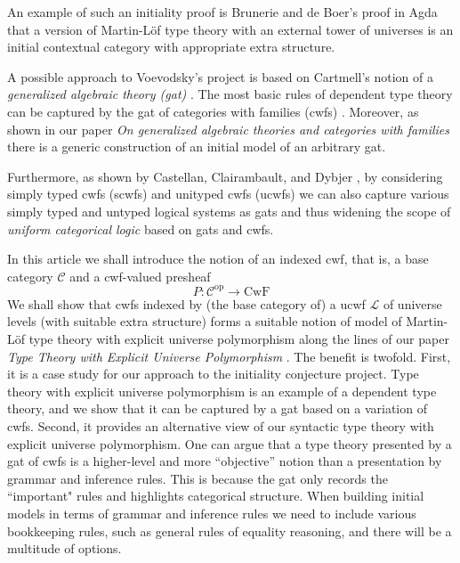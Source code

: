 \documentclass[11pt,a4paper]{article}
\theoremstyle{definition}
\newcommand{\op}{\mathrm{op}}
\def\L{{\mathcal{L}}}
\def\CwF{\mathrm{CwF}}
\def\C{\mathcal{C}}
\begin{document}
An example of such an initiality proof is Brunerie and de Boer's \cite{Brunerie:initiality,deBoer:lic} proof in Agda that a version of Martin-Löf type theory with an external tower of universes is an initial contextual category \cite{cartmell:phd,cartmell:apal} with appropriate extra structure. %

A possible approach to Voevodsky's project is based on Cartmell's notion of a {\em generalized algebraic theory (gat)} \cite{cartmell:phd,cartmell:apal}. The most basic rules of dependent type theory can be captured by the gat of categories with families (cwfs) \cite{dybjer:torino}. Moreover, as shown in our paper {\em On generalized algebraic theories and categories with families} \cite{bezem:hofmann} there is a generic construction of an initial model of an arbitrary gat. 

Furthermore, as shown by Castellan, Clairambault, and Dybjer \cite{castellan:lambek}, by considering simply typed cwfs (scwfs) and unityped cwfs (ucwfs) we can also capture various simply typed and untyped logical systems as gats and thus widening the scope of {\em uniform categorical logic} based on gats and cwfs.

In this article we shall introduce the notion of an indexed cwf, that is, a base category $\C$ and a cwf-valued presheaf
$$
P : \C^\op \to \CwF
$$
We shall show that cwfs indexed by (the base category of) a ucwf $\L$ of universe levels (with suitable extra structure) forms a suitable notion of model of Martin-Löf type theory with explicit universe polymorphism along the lines of our paper {\em Type Theory with Explicit Universe Polymorphism} \cite{BezemCDE22}. The benefit is twofold. First, it is a case study for our approach to the initiality conjecture project. Type theory with explicit universe polymorphism is an example of a dependent type theory, and we show that it can be captured by a gat based on a variation of cwfs. Second, it provides an alternative view of our syntactic type theory with explicit universe polymorphism. One can argue that a type theory presented by a gat of cwfs is a higher-level and more ``objective'' notion than a presentation by grammar and inference rules. This is because the gat only records the ``important" rules and highlights categorical structure. When building initial models in terms of grammar and inference rules we  need to include various bookkeeping rules, such as general rules of equality reasoning, and there will be a multitude of options. 
\end{document}
